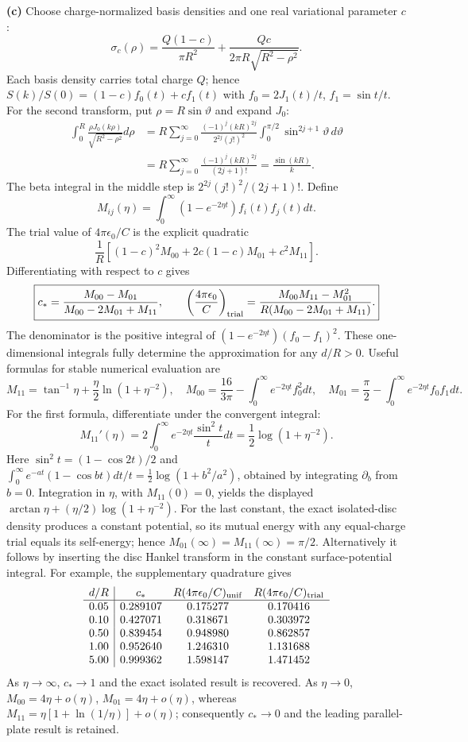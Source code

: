 \textbf{(c)} Choose charge-normalized basis densities and one real
variational parameter $c$:
\[
\sigma_c(\rho)=\frac{Q(1-c)}{\pi R^2}
+\frac{Qc}{2\pi R\sqrt{R^2-\rho^2}}.
\]
Each basis density carries total charge $Q$; hence
$S(k)/S(0)=(1-c)f_0(t)+cf_1(t)$ with
$f_0=2J_1(t)/t$, $f_1=\sin t/t$.  For the second transform, put $\rho=R\sin\vartheta$ and expand $J_0$:
\begin{align*}
\int_0^R\frac{\rho J_0(k\rho)}{\sqrt{R^2-\rho^2}}d\rho
&=R\sum_{j=0}^\infty\frac{(-1)^j(kR)^{2j}}{2^{2j}(j!)^2}
 \int_0^{\pi/2}\sin^{2j+1}\vartheta\,d\vartheta\\
&=R\sum_{j=0}^\infty\frac{(-1)^j(kR)^{2j}}{(2j+1)!}
=\frac{\sin(kR)}k.
\end{align*}
The beta integral in the middle step is
$2^{2j}(j!)^2/(2j+1)!$.  Define
\[
M_{ij}(\eta)=\int_0^\infty(1-e^{-2\eta t})f_i(t)f_j(t)dt.
\]
The trial value of $4\pi\epsilon_0/C$ is the explicit quadratic
\[
\frac1R[(1-c)^2M_{00}+2c(1-c)M_{01}+c^2M_{11}].
\]
Differentiating with respect to $c$ gives
\[
\boxed{c_* =\frac{M_{00}-M_{01}}{M_{00}-2M_{01}+M_{11}},\qquad
\left(\frac{4\pi\epsilon_0}{C}\right)_{\rm trial}
=\frac{M_{00}M_{11}-M_{01}^2}
{R(M_{00}-2M_{01}+M_{11})}.}
\]
The denominator is the positive integral of
$(1-e^{-2\eta t})(f_0-f_1)^2$.  These one-dimensional integrals
fully determine the approximation for any $d/R>0$.  Useful formulas
for stable numerical evaluation are
\[
M_{11}=\tan^{-1}\eta+\frac\eta2\ln(1+\eta^{-2}),\quad
M_{00}=\frac{16}{3\pi}-\int_0^\infty e^{-2\eta t}f_0^2dt,\quad
M_{01}=\frac\pi2-\int_0^\infty e^{-2\eta t}f_0f_1dt.
\]
For the first formula, differentiate under the convergent integral:
\[
M_{11}'(\eta)=2\int_0^\infty e^{-2\eta t}\frac{\sin^2t}{t}dt
=\frac12\log(1+\eta^{-2}).
\]
Here $\sin^2t=(1-\cos2t)/2$ and
$\int_0^\infty e^{-at}(1-\cos bt)dt/t=\tfrac12\log(1+b^2/a^2)$,
obtained by integrating $\partial_b$ from $b=0$.
Integration in $\eta$, with $M_{11}(0)=0$, yields the displayed
$\arctan\eta+(\eta/2)\log(1+\eta^{-2})$.
For the last constant, the exact isolated-disc density produces a
constant potential, so its mutual energy with any equal-charge
trial equals its self-energy; hence $M_{01}(\infty)=M_{11}(\infty)
=\pi/2$.  Alternatively it follows by inserting the disc Hankel
transform in the constant surface-potential integral.
For example, the supplementary quadrature gives
\[
\begin{array}{c|ccc}
 d/R&c_*&R(4\pi\epsilon_0/C)_{\rm unif}
 &R(4\pi\epsilon_0/C)_{\rm trial}\\\hline
0.05&0.289107&0.175277&0.170416\\
0.10&0.427071&0.318671&0.303972\\
0.50&0.839454&0.948980&0.862857\\
1.00&0.952640&1.246310&1.131688\\
5.00&0.999362&1.598147&1.471452
\end{array}
\]
As $\eta\to\infty$, $c_*\to1$ and the exact isolated result is
recovered.  As $\eta\to0$, $M_{00}=4\eta+o(\eta)$,
$M_{01}=4\eta+o(\eta)$, whereas
$M_{11}=\eta[1+\ln(1/\eta)]+o(\eta)$; consequently $c_*\to0$
and the leading parallel-plate result is retained.

